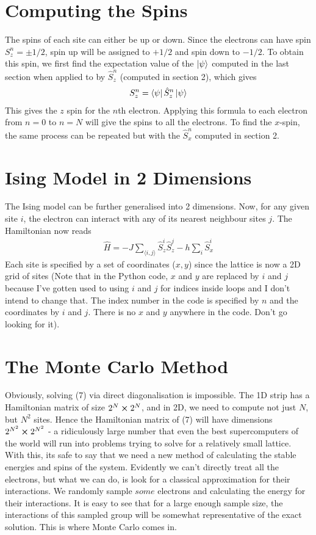 \documentclass{article}
\newcommand{\la}{\langle}
\newcommand{\ra}{\rangle}
\begin{document}
\section{Computing the Spins}
The spins of each site can either be up or down. Since the electrons can have spin $S_z^n=\pm 1/2$, spin up will be 
assigned to $+1/2$ and spin down to $-1/2$. To obtain this spin, we first find the expectation value of the $\ket{\psi}$ computed in the last section 
when applied to by $\hat{S}^n_z$ (computed in section 2), which gives 
\begin{align}
    S^n_z=\bra{\psi}\hat{S}^n_z\ket{\psi}
\end{align}
This gives the $z$ spin for the $n$th electron. 
Applying this formula to each electron from $n=0$ to $n=N$ will give the spins to all the electrons. To find the $x$-spin, 
the same process can be repeated but with the $\hat{S}^n_x$ computed in section 2.

\section{Ising Model in 2 Dimensions}
The Ising model can be further generalised into 2 dimensions. Now, for any 
given site $i$, 
the electron can interact with any of its nearest neighbour 
sites $j$. The Hamiltonian now reads 
\begin{align}
    \hat{H}=-J\sum_{\la i,j\ra}\hat{S}_z^i \hat{S}_z^{j}-h\sum_{i}\hat{S}_x^i
\end{align}
Each site is specified by a set of coordinates ($x,y$) 
since the lattice is now a 2D grid of sites (Note that in the Python code, $x$ and $y$ are replaced by $i$ and $j$ because 
I've gotten used to using $i$ and $j$ for 
indices inside loops and I don't intend to change that. 
The index number in the code is specified by $n$ and the coordinates by $i$ and $j$.
 There is no $x$ and $y$ anywhere in the code. Don't go looking for it). 

\section{The Monte Carlo Method}
Obviously, solving (7) via direct diagonalisation is impossible. The 1D strip has a
Hamiltonian matrix of 
size $2^N\cross 2^N$, and in 2D, we need to compute not just $N$, but $N^2$ sites. Hence the 
Hamiltonian matrix of (7) will have dimensions $2^{N^2}\cross 2^{N^2}$ - a ridiculously large number that 
 even the best supercomputers of the world will run into problems trying to solve for a relatively small lattice. 
With this, its safe to say that we need a new method of calculating the stable
 energies and spins of the system.
  Evidently we can't directly treat all the electrons, but what we can do, is look for a 
  classical approximation for their interactions. 
We randomly sample $some$ electrons and calculating the energy for their interactions. 
It is easy to see that for a large enough sample size, 
the interactions of this sampled group will be somewhat 
representative of the exact solution. This is where Monte Carlo comes in. 
\end{document}
